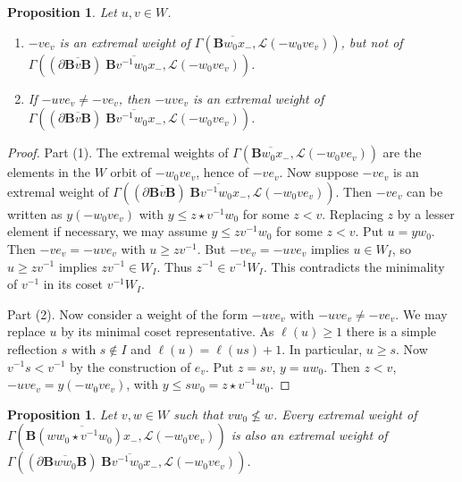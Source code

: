 \documentclass[sn-mathphys-num]{sn-jnl}%
\newcommand{\Ll}{\mathcal L}
\newcommand{\fb}{\mathbf B}
\newtheorem{proposition}[theorem]{Proposition}
\theoremstyle{definition}
\begin{document}
 \begin{proposition}\label{prop:extremalQ}
 Let $u,v\in W$.
 \begin{enumerate}
 \item $-ve_v$ is an extremal weight of $\Gamma(\overline{{\fb}w_0x_-},\Ll(-w_0ve_v))$, but not of 
 $\Gamma((\partial \overline{{\fb}v\fb})\;\overline{{\fb}v^{-1}w_0x_-},\Ll(-w_0ve_v))$.
 \item If $-uve_v\neq -ve_v$, then $-uve_v$ is an extremal weight of 
 $\Gamma((\partial \overline{{\fb}v{\fb}})\;\overline{{\fb}v^{-1}w_0x_-},\Ll(-w_0ve_v))$.
 \end{enumerate}
 \end{proposition}
 \begin{proof}Part (1).
 The extremal weights of $\Gamma(\overline{{\fb}w_0x_-},\Ll(-w_0ve_v))$ are the elements in the $W$ orbit of $-w_0ve_v$,
 hence of $-ve_v$.
 Now suppose $-ve_v$ is  an extremal weight of $\Gamma((\partial \overline{{\fb}v{\fb}})\;\overline{{\fb}v^{-1}w_0x_-},\Ll(-w_0ve_v))$.
Then $-ve_v$ can be written as $y(-w_0ve_v)$ with $y\leq z\star v^{-1}w_0$ for some $z<v$.
Replacing $z$ by a lesser element if necessary, we may assume $y\leq zv^{-1}w_0$ for some $z<v$.
Put $u=yw_0$. Then $-ve_v=-uve_v$ with $u\geq zv^{-1}$. But $-ve_v=-uve_v$ implies $u\in W_I$, so 
$u\geq zv^{-1}$ implies $zv^{-1}\in W_I$. Thus $z^{-1}\in v^{-1}W_I$.
This contradicts the minimality of $v^{-1}$ in its coset $v^{-1}W_I$.

Part (2). Now consider a weight of the form $-uve_v$ with $-uve_v\neq -ve_v$. We may replace $u$ by its minimal coset representative.
As $\ell(u)\geq 1$ there is a simple reflection $s$ with $s\notin I$ and $\ell(u)= \ell(us)+1$. In particular, $u\geq s$.
Now $v^{-1}s<v^{-1}$ by the construction of $e_v$. Put $z=sv$, $y=uw_0$. Then $z<v$, $-uve_v=y(-w_0ve_v)$, with
$y\leq sw_0=z\star v^{-1}w_0$.
 \end{proof}
 
 
 \begin{proposition}\label{prop:vw_0 notless w}
 Let $v,w\in W$ such that $vw_0\nleq w$.
 Every extremal weight of $\Gamma(\overline{{\fb}(ww_0\star v^{-1}w_0)x_-},\Ll(-w_0ve_v))$ is also an 
 extremal weight of 
 $\Gamma((\partial \overline{{\fb}ww_0{\fb}})\;\overline{{\fb}v^{-1}w_0x_-},\Ll(-w_0ve_v))$.
 \end{proposition}
\end{document}
